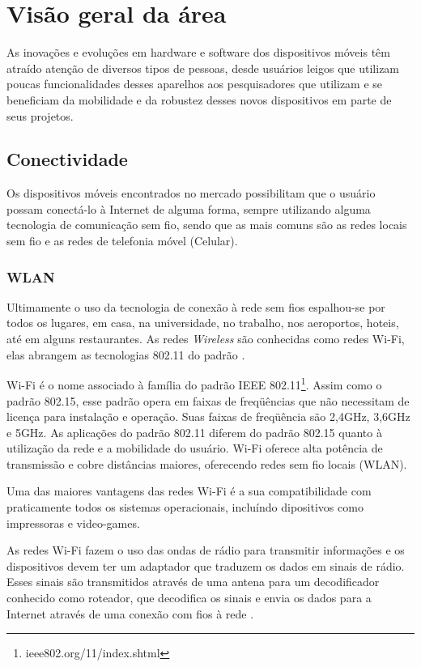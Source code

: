 \chapter{Visão geral da área}

As inovações e evoluções em hardware e software dos dispositivos móveis têm atraído atenção de diversos tipos de pessoas, desde usuários leigos que utilizam poucas funcionalidades desses aparelhos aos pesquisadores que utilizam e se beneficiam da mobilidade e da robustez desses novos dispositivos em parte de seus projetos.

\section{Conectividade}
Os dispositivos móveis encontrados no mercado possibilitam que o usuário possam conectá-lo à Internet de alguma forma, sempre utilizando alguma tecnologia de comunicação sem fio, sendo que as mais comuns são as redes locais sem fio  e as redes de telefonia móvel (Celular).
\subsection{WLAN}
Ultimamente o uso da tecnologia de conexão à rede sem fios espalhou-se por todos os lugares, em casa, na universidade, no trabalho, nos aeroportos, hoteis, até em alguns restaurantes.
As redes \textit{Wireless} são conhecidas como redes Wi-Fi, elas abrangem as tecnologias 802.11 do padrão .
\begin{citacao}
Wi-Fi é o nome associado à família do padrão IEEE 802.11\footnote{ieee802.org/11/index.shtml}. Assim como o
padrão 802.15, esse padrão opera em faixas de freqüências que não necessitam de licença para instalação e operação. Suas faixas de freqüência são 2,4GHz, 3,6GHz e 5GHz. As aplicações do padrão 802.11 diferem do padrão 802.15 quanto à utilização da rede e a mobilidade do usuário. Wi-Fi oferece alta potência de transmissão e cobre distâncias maiores, oferecendo redes sem fio locais (WLAN). \cite{vanni09}
\end{citacao}
Uma das maiores vantagens das redes Wi-Fi é a sua compatibilidade com praticamente todos os sistemas operacionais, incluíndo dipositivos como impressoras e video-games.

As redes Wi-Fi fazem o uso das ondas de rádio para transmitir informações e os dispositivos devem ter um adaptador que traduzem os dados em sinais de rádio. Esses sinais são transmitidos através de uma antena para um decodificador conhecido como roteador, que decodifica os sinais e envia os dados para a Internet através de uma conexão com fios à rede .

